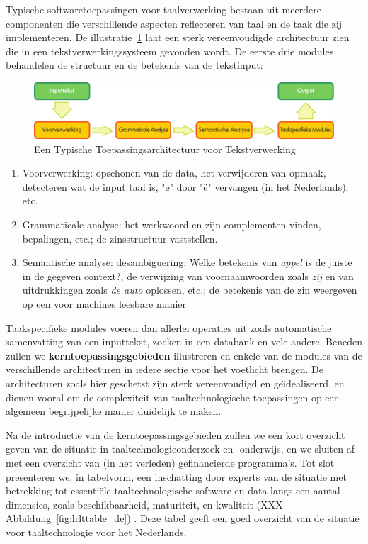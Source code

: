 \documentclass[]{../../metanetpaper}
\begin{document}
\begin{multicols}{2}
Typische softwaretoepassingen voor taalverwerking bestaan uit meerdere componenten die verschillende aspecten reflecteren van taal en de taak die zij implementeren. De illustratie~\ref{fig:textprocessingarch_de} laat een sterk vereenvoudigde architectuur zien die in een tekstverwerkingssysteem gevonden wordt. De eerste drie modules behandelen de structuur en de betekenis van de tekstinput:
\begin{figure}[b]
  \center
  \includegraphics[width=\textwidth]{../_media/dutch/text_processing_app_architecture}
  \caption{Een Typische Toepassingsarchitectuur voor Tekstverwerking}
  \label{fig:textprocessingarch_de}
\end{figure}
%
    \begin{enumerate}
 	\item Voorverwerking: opschonen van de data, het verwijderen van opmaak, detecteren wat de input taal is, "e" door "{\"e}" vervangen (in het Nederlands), etc.
 	\item Grammaticale analyse: het werkwoord en zijn complementen vinden, bepalingen, etc.; de zinsstructuur vaststellen.
 	\item Semantische analyse: desambiguering: Welke betekenis van \emph{appel} is de juiste in de gegeven context?, de verwijzing van voornaamwoorden zoals \emph{zij} en van uitdrukkingen zoals \emph{de auto} oplossen, etc.; de betekenis van de zin weergeven op een voor machines leesbare manier
    \end{enumerate}
%
    Taakspecifieke modules voeren dan allerlei operaties uit zoals automatische samenvatting van een inputtekst, zoeken in een databank en vele andere. Beneden zullen we \textbf{kerntoepassingsgebieden} illustreren en enkele van de modules van de verschillende architecturen in iedere sectie voor het voetlicht brengen. De architecturen zoals hier geschetst zijn sterk vereenvoudigd en ge{\"\i}dealiseerd, en dienen vooral om de complexiteit van taaltechnologische toepassingen op een algemeen begrijpelijke manier duidelijk te maken.

    Na de introductie van de kerntoepassingsgebieden zullen we een kort overzicht geven van de situatie in taaltechnologieonderzoek en -onderwijs, en we sluiten af met een overzicht van (in het verleden) gefinancierde programma's. Tot slot presenteren we, in tabelvorm, een inschatting door experts van de situatie met betrekking tot essenti{\"e}le taaltechnologische software en data langs een aantal dimensies, zoals beschikbaarheid, maturiteit, en kwaliteit (XXX Abbildung~\ref{fig:lrlttable_de}) . Deze tabel geeft een goed overzicht van de situatie voor taaltechnologie voor het Nederlands.


\end{multicols}
\end{document}

